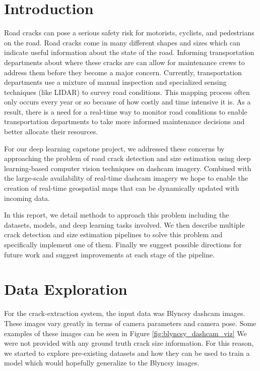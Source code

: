 \documentclass{article}
\begin{document}

\section{Introduction}
Road cracks can pose a serious safety risk for motorists, cyclists, and pedestrians on the road. 
Road cracks come in many different shapes and sizes which can indicate useful information about the state of the road. Informing transportation departments about where these cracks are can allow for maintenance crews to address them before they become a major concern.
Currently, transportation departments use a mixture of manual inspection and specialized sensing techniques (like LIDAR) to survey road conditions. 
This mapping process often only occurs every year or so because of how costly and time intensive it is.
As a result, there is a need for a real-time way to monitor road conditions to enable transportation departments to take more informed maintenance decisions and better allocate their resources. 

For our deep learning capstone project, we addressed these concerns by approaching the problem of road crack detection and size estimation using deep learning-based computer vision techniques on dashcam imagery.
Combined with the large-scale availability of real-time dashcam imagery we hope to enable the creation of real-time geospatial maps that can be dynamically updated with incoming data.

In this report, we detail methods to approach this problem including the datasets, models, and deep learning tasks involved. 
We then describe multiple crack detection and size estimation pipelines to solve this problem and specifically implement one of them.
Finally we suggest possible directions for future work and suggest improvements at each stage of the pipeline.

\section{Data Exploration}
For the crack-extraction system, the input data was Blyncsy dashcam images. 
These images vary greatly in terms of camera parameters and camera pose. Some examples of these images can be seen in Figure \ref{fig:blyncsy_dashcam_viz}
We were not provided with any ground truth crack size information. For this reason, we started to explore pre-existing datasets and how they can be used to train a model which would hopefully generalize to the Blyncsy images.
\end{document}
